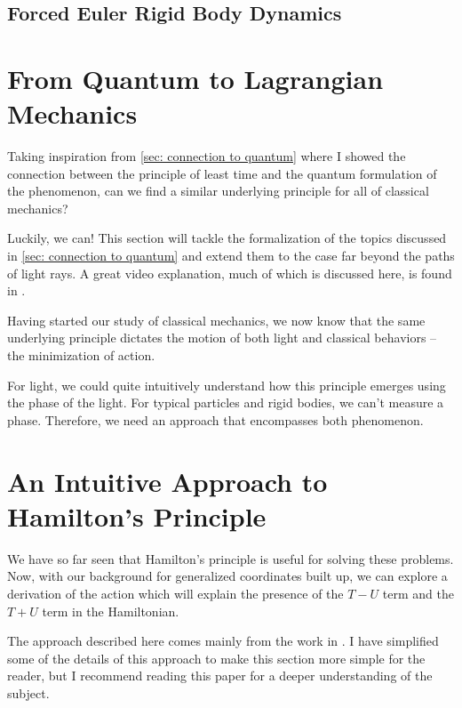\subsection{Forced Euler Rigid Body Dynamics}

\section{From Quantum to Lagrangian Mechanics}
Taking inspiration from \autoref{sec: connection to quantum} where I showed the connection between the principle of least time and the quantum formulation of the phenomenon, can we find a similar underlying principle for all of classical mechanics?

Luckily, we can! This section will tackle the formalization of the topics discussed in \autoref{sec: connection to quantum} and extend them to the case far beyond the paths of light rays. A great video explanation, much of which is discussed here, is found in \cite{physics_with_elliot_how_2023}.

Having started our study of classical mechanics, we now know that the same underlying principle dictates the motion of both light and classical behaviors -- the minimization of action. 

For light, we could quite intuitively understand how this principle emerges using the phase of the light. For typical particles and rigid bodies, we can't measure a phase. Therefore, we need an approach that encompasses both phenomenon.


 \section{An Intuitive Approach to Hamilton's Principle}

 We have so far seen that Hamilton's principle is useful for solving these problems. Now, with our background for generalized coordinates built up, we can explore a derivation of the action which will explain the presence of the $T-U$ term and the $T+U$ term in the \gls{Hamiltonian}.

The approach described here comes mainly from the work in \cite{carcassi_geometric_2023}. I have simplified some of the details of this approach to make this section more simple for the reader, but I recommend reading this paper for a deeper understanding of the subject.
 

